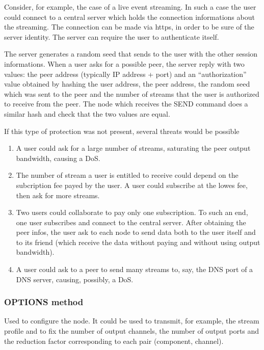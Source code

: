 \documentclass{article}
\begin{document}
\begin{example}
  Consider, for example, the case of a live event streaming.  In such
  a case the user could connect to a central server which holds the
  connection informations about the streaming.  The connection can be
  made via https, in order to be sure of the server identity.  The
  server can require the user to authenticate itself.   

  The server generates a random seed that sends to the user with the
  other session informations.  When a user asks for a  possible
  peer, the server reply with two values: the peer address (typically
  IP address + port) and an ``authorization'' value obtained by
  hashing the user address, the peer address, the random seed
  which was sent to the peer and the number of streams that the user
  is authorized to receive from the peer.  The node which receives the
  SEND command does a similar hash and check that the two values are
  equal. 

  If this type of protection was not present, several threats would be
  possible 
  \begin{enumerate}
    \item A user could ask for a large number of streams, saturating
    the peer output bandwidth, causing a DoS.
    \item The number of stream a user is entitled to receive could
    depend on the subcription fee payed by the user.  A user could
    subscribe at the lowes fee, then ask for more streams.
    \item Two users could collaborate to pay only one subscription.
    To such an end, one user subscribes and connect to the central
    server.  After obtaining the peer infos, the user ask to each node
    to send data both to the user itself and to its friend (which
    receive the data without paying and without using output
    bandwidth).
   \item A user could ask to a peer to send many streams to, say, the
   DNS port of a DNS server, causing, possibly, a DoS.
  \end{enumerate}
\end{example}

\subsubsection{OPTIONS method}
\label{sub:2.2;transport_layer}

Used to configure the node.  It could be used to transmit, for
example, the stream profile and to fix the number of output channels,
the number of output ports and the reduction factor corresponding to
each pair (component, channel).
\end{document}
